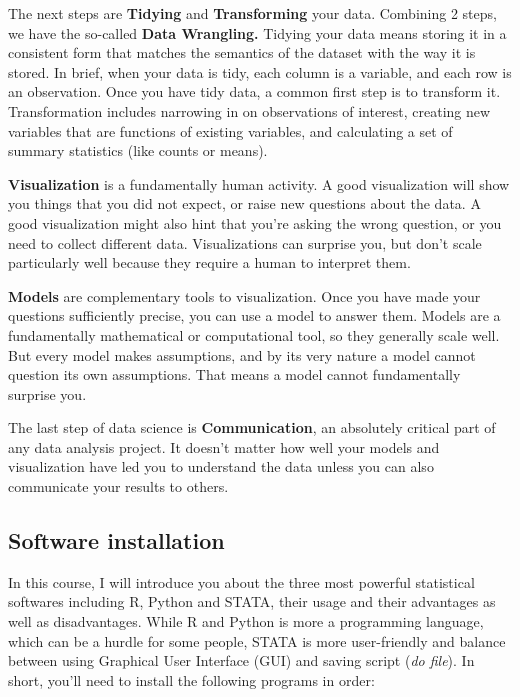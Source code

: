 \documentclass[
]{article}
\begin{document}
The next steps are \textbf{Tidying} and \textbf{Transforming} your data. Combining 2 steps, we have the so-called \textbf{Data Wrangling.} Tidying your data means storing it in a consistent form that matches the semantics of the dataset with the way it is stored. In brief, when your data is tidy, each column is a variable, and each row is an observation. Once you have tidy data, a common first step is to transform it. Transformation includes narrowing in on observations of interest, creating new variables that are functions of existing variables, and calculating a set of summary statistics (like counts or means).

\textbf{Visualization} is a fundamentally human activity. A good visualization will show you things that you did not expect, or raise new questions about the data. A good visualization might also hint that you're asking the wrong question, or you need to collect different data. Visualizations can surprise you, but don't scale particularly well because they require a human to interpret them.

\textbf{Models} are complementary tools to visualization. Once you have made your questions sufficiently precise, you can use a model to answer them. Models are a fundamentally mathematical or computational tool, so they generally scale well. But every model makes assumptions, and by its very nature a model cannot question its own assumptions. That means a model cannot fundamentally surprise you.

The last step of data science is \textbf{Communication}, an absolutely critical part of any data analysis project. It doesn't matter how well your models and visualization have led you to understand the data unless you can also communicate your results to others.

\hypertarget{software-installation}{%
\subsection{Software installation}\label{software-installation}}

In this course, I will introduce you about the three most powerful statistical softwares including R, Python and STATA, their usage and their advantages as well as disadvantages. While R and Python is more a programming language, which can be a hurdle for some people, STATA is more user-friendly and balance between using Graphical User Interface (GUI) and saving script (\emph{do file}). In short, you'll need to install the following programs in order:
\end{document}
